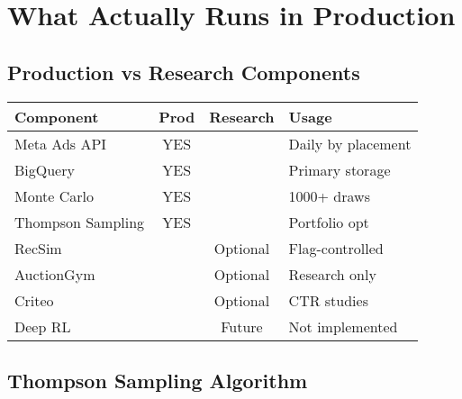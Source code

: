 \documentclass[11pt,a4paper]{report}
\begin{document}
\chapter{What Actually Runs in Production}

\section{Production vs Research Components}

\begin{center}
\begin{tabular}{|l|c|c|l|}
\hline
\rowcolor{aelpblue!20}
\textbf{Component} & \textbf{Prod} & \textbf{Research} & \textbf{Usage} \\
\hline
Meta Ads API & \cellcolor{aelpgreen!30}YES & & Daily by placement \\
BigQuery & \cellcolor{aelpgreen!30}YES & & Primary storage \\
Monte Carlo & \cellcolor{aelpgreen!30}YES & & 1000+ draws \\
Thompson Sampling & \cellcolor{aelpgreen!30}YES & & Portfolio opt \\
\hline
\rowcolor{aelpgray!20}
RecSim & & \cellcolor{aelpgray!30}Optional & Flag-controlled \\
\rowcolor{aelpgray!20}
AuctionGym & & \cellcolor{aelpgray!30}Optional & Research only \\
\rowcolor{aelpgray!20}
Criteo & & \cellcolor{aelpgray!30}Optional & CTR studies \\
\rowcolor{aelpgray!20}
Deep RL & & \cellcolor{aelpgray!30}Future & Not implemented \\
\hline
\end{tabular}
\end{center}

\section{Thompson Sampling Algorithm}
\end{document}
